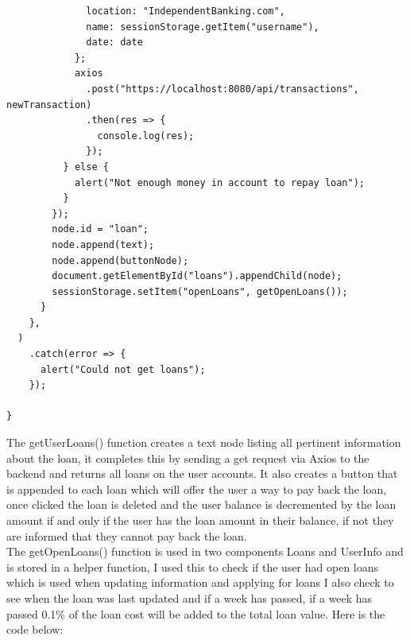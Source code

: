 \begin{verbatim}
              location: "IndependentBanking.com",
              name: sessionStorage.getItem("username"),
              date: date
            };
            axios
              .post("https://localhost:8080/api/transactions", newTransaction)
              .then(res => {
                console.log(res);
              });
          } else {
            alert("Not enough money in account to repay loan");
          }
        });
        node.id = "loan";
        node.append(text);
        node.append(buttonNode);
        document.getElementById("loans").appendChild(node);
        sessionStorage.setItem("openLoans", getOpenLoans());
      }
    },
  )
    .catch(error => {
      alert("Could not get loans");
    });

}
\end{verbatim}
The getUserLoans() function creates a text node listing all pertinent information about the loan, it completes this by sending a get request via Axios to the backend and returns all loans on the user accounts.  It also creates a button that is appended to each loan which will offer the user a way to pay back the loan, once clicked the loan is deleted and the user balance is decremented by the loan amount if and only if the user has the loan amount in their balance, if not they are informed that they cannot pay back the loan.
\\
The getOpenLoans() function is used in two components Loans and UserInfo and is stored in a helper function, I used this to check if the user had open loans which is used when updating information and applying for loans I also check to see when the loan was last updated and if a week has passed, if a week has passed 0.1\% of the loan cost will be added to the total loan value. Here is the code below:
